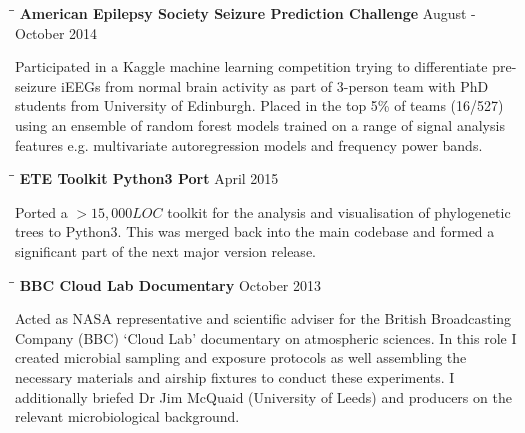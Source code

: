 \documentclass{res}
\begin{document}
\begin{resume}
   \vspace{-0.1in} 
   \begin{tabbing}
   \hspace{2in}\= \hspace{2.6in}\= \kill 
   {\bf American Epilepsy Society Seizure Prediction Challenge} \> \>        August - October 2014\\
     \end{tabbing}\vspace{-20pt}      
     Participated in a Kaggle machine learning competition trying to differentiate pre-seizure iEEGs from normal brain activity as part of 3-person team with PhD students from University of Edinburgh. 
     Placed in the top 5\% of teams (16/527) using an ensemble of random forest models trained on a range of signal analysis features e.g. multivariate autoregression models and frequency power bands.

     \vspace{-0.1in}
   \begin{tabbing}
   \hspace{2in}\= \hspace{2.6in}\= \kill 
    {\bf ETE Toolkit Python3 Port} \> \>        April 2015\\
     \end{tabbing}\vspace{-20pt}      
     Ported a \(>15,000 LOC\) toolkit for the
     analysis and visualisation of phylogenetic trees to Python3.  This was merged back into the main
     codebase and formed a significant part of 
     the next major version release.
   \vspace{-0.1in} 

   \begin{tabbing}
   \hspace{2in}\= \hspace{2.6in}\= \kill 
    {\bf BBC Cloud Lab Documentary} \> \>        October 2013\\
     \end{tabbing}\vspace{-20pt}      
     Acted as NASA representative and scientific adviser for the British Broadcasting Company (BBC) `Cloud Lab' documentary on atmospheric sciences. In this role I created microbial sampling and exposure protocols as well assembling the necessary materials and airship fixtures to conduct these experiments. I additionally briefed Dr Jim McQuaid (University of Leeds) and producers on the relevant microbiological background. 


\end{resume}
\end{document}
